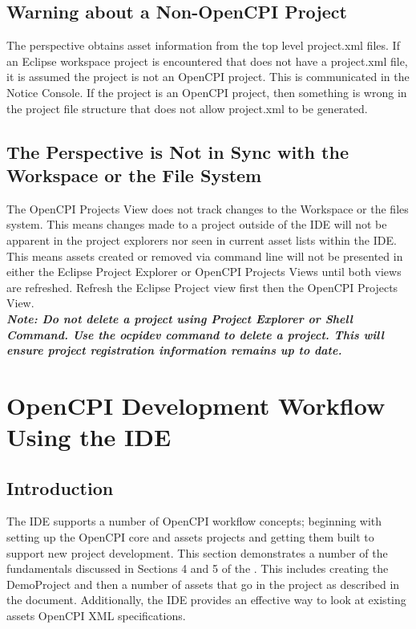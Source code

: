 \documentclass[10pt, a4paper, oneside]{article}
\begin{document}
\subsection {Warning about a Non-OpenCPI Project}
The perspective obtains asset information from the top level project.xml files. If an Eclipse workspace project is encountered that does not have a project.xml file, it is assumed the project is not an OpenCPI project. This is communicated in the Notice Console. If the project is an OpenCPI project, then something is wrong in the project file structure that does not allow project.xml to be generated.
\subsection{The Perspective is Not in Sync with the Workspace or the File System}
The OpenCPI Projects View does not track changes to the Workspace or the files system. This means changes made to a project outside of the IDE will not be apparent in the project explorers nor seen in current asset lists within the IDE. This means assets created or removed via command line will not be presented in either the Eclipse Project Explorer or OpenCPI Projects Views until both views are refreshed. Refresh the Eclipse Project view first then the OpenCPI Projects View.\\

\textbf{\emph{Note: Do not delete a project using Project Explorer or Shell Command. Use the ocpidev command to delete a project. This will ensure project registration information remains up to date.}}
\section{OpenCPI Development Workflow Using the IDE}
\subsection{Introduction}
The IDE supports a number of OpenCPI workflow concepts; beginning with setting up the OpenCPI core and assets projects and getting them built to support new project development. This section demonstrates a number of the fundamentals discussed in Sections 4 and 5 of the . This includes creating the DemoProject and then a number of assets that go in the project as described in the document. Additionally, the IDE provides an effective way to look at existing assets OpenCPI XML specifications.
\end{document}

